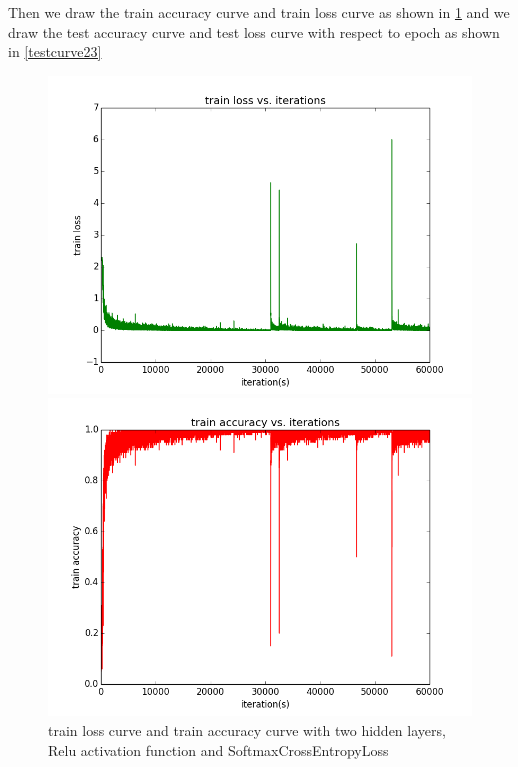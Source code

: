 \documentclass{elegantbook}
\begin{document}
Then we draw the train accuracy curve and train loss curve as shown in \ref{traincurve23} and we draw the test accuracy curve and test loss curve with respect to epoch as shown in \ref{testcurve23}
\begin{figure}[!ht]
	\centering
	\begin{minipage}[t]{0.45\textwidth}
		\centering
		\includegraphics[width=\textwidth]{trainloss2rs}
	\end{minipage}
	\begin{minipage}[t]{0.45\textwidth}
		\centering
		\includegraphics[width=\textwidth]{trainacc2rs}
	\end{minipage}
	\caption{\label{traincurve23}train loss curve and train accuracy curve with two hidden layers, Relu activation function and SoftmaxCrossEntropyLoss}
\end{figure}
\end{document}
